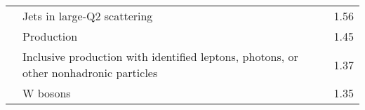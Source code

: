 \begin{longtable}[H]{p{}|p{}|p{}}
                                                                               & Jets in large-Q2 scattering &  1.56 \\
                                                                               & Production &  1.45 \\
                                                                               & Inclusive production with identified leptons, photons, or other nonhadronic particles &  1.37 \\
                                                                               & W bosons &  1.35 \\
\end{longtable}
